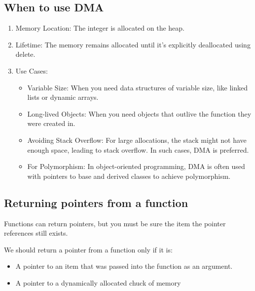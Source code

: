 \documentclass{report}
\begin{document}
    \subsection{When to use DMA}
    \bigbreak \noindent 
    \begin{enumerate}
        \item Memory Location: The integer is allocated on the heap.
        \item Lifetime: The memory remains allocated until it's explicitly deallocated using delete.
        \item Use Cases:
        \begin{itemize}
            \item Variable Size: When you need data structures of variable size, like linked lists or dynamic arrays.
            \item Long-lived Objects: When you need objects that outlive the function they were created in.
            \item Avoiding Stack Overflow: For large allocations, the stack might not have enough space, leading to stack overflow. In such cases, DMA is preferred.
            \item For Polymorphism: In object-oriented programming, DMA is often used with pointers to base and derived classes to achieve polymorphism.
        \end{itemize}
    \end{enumerate}

    \bigbreak \noindent 
    \subsection{Returning pointers from a function}
    \bigbreak \noindent 
    \begin{concept}
 Functions can return pointers, but you must be sure the item the pointer references still exists.
	\end{concept}
    \bigbreak \noindent 
    We should return  a pointer from a function only if it is:
    \begin{itemize}
        \item A pointer to an item that was passed into the function as an argument.
        \item A pointer to a dynamically allocated chuck of memory
    \end{itemize}

    \bigbreak \noindent 
\end{document}
